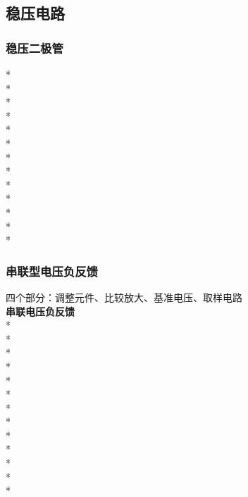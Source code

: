 \documentclass[UTF8, fontset=none]{ctexart}
\begin{document}
\begin{multicols*}{8}
\subsection{稳压电路}
\subsubsection{稳压二极管}
*\\
*\\
*\\
*\\
*\\
*\\
*\\
*\\
*\\
*\\
*\\
*\\
*
\subsubsection{串联型电压负反馈}
四个部分：调整元件、比较放大、基准电压、取样电路\\
\textbf{串联电压负反馈}\\
*\\
*\\
*\\
*\\
*\\
*\\
*\\
*\\
*\\
*\\
*\\
*\\
*

\end{multicols*}
\end{document}
